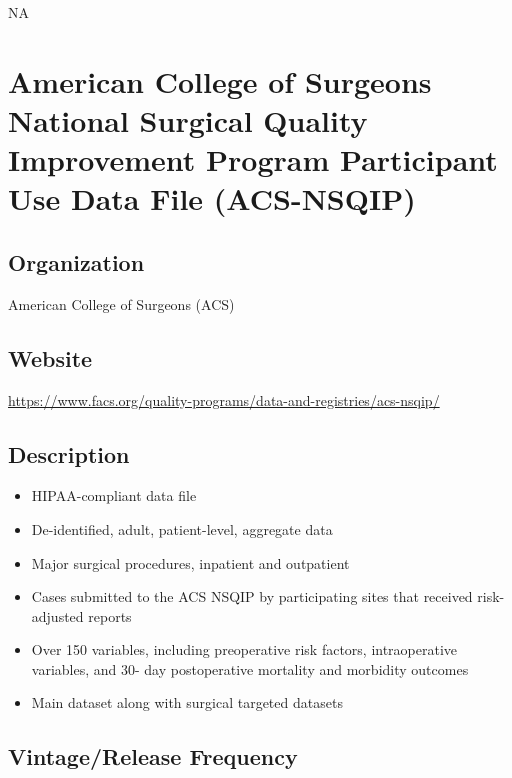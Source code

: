 \documentclass[
]{book}
\providecommand{\tightlist}{%
  \setlength{\itemsep}{0pt}\setlength{\parskip}{0pt}}
\begin{document}
NA

\mainmatter

\hypertarget{american-college-of-surgeons-national-surgical-quality-improvement-program-participant-use-data-file-acs-nsqip}{%
\chapter{American College of Surgeons National Surgical Quality Improvement Program Participant Use Data File (ACS-NSQIP)}\label{american-college-of-surgeons-national-surgical-quality-improvement-program-participant-use-data-file-acs-nsqip}}

\hypertarget{organization-3}{%
\section{Organization}\label{organization-3}}

American College of Surgeons (ACS)

\hypertarget{website-3}{%
\section{Website}\label{website-3}}

\url{https://www.facs.org/quality-programs/data-and-registries/acs-nsqip/}

\hypertarget{description-3}{%
\section{Description}\label{description-3}}

\begin{itemize}
\tightlist
\item
  HIPAA-compliant data file
\item
  De-identified, adult, patient-level, aggregate data
\item
  Major surgical procedures, inpatient and outpatient
\item
  Cases submitted to the ACS NSQIP by participating sites that received risk-adjusted reports
\item
  Over 150 variables, including preoperative risk factors, intraoperative variables, and 30- day postoperative mortality and morbidity outcomes
\item
  Main dataset along with surgical targeted datasets
\end{itemize}

\hypertarget{vintagerelease-frequency-3}{%
\section{Vintage/Release Frequency}\label{vintagerelease-frequency-3}}
\end{document}
